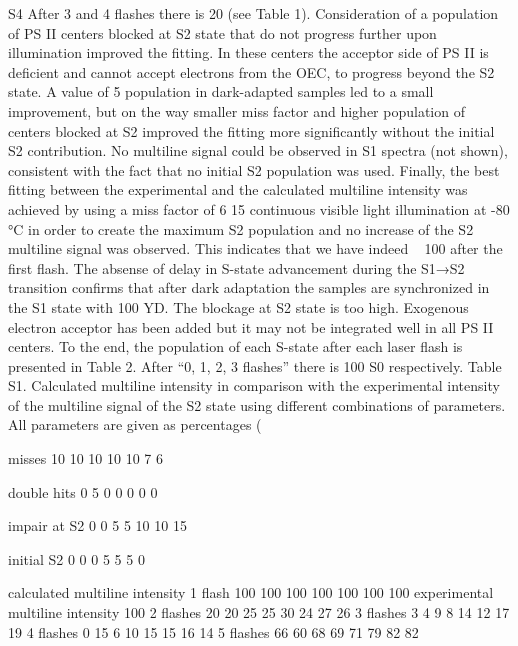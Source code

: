 S4 
After 3 and 4 flashes there is 20%
(see Table 1). Consideration of a population of PS II centers blocked at S2 state that do not progress 
further upon illumination improved the fitting. In these centers the acceptor side of PS II is 
deficient and cannot accept electrons from the OEC, to progress beyond the S2 state. A value of 
5%
population in dark-adapted samples led to a small improvement, but on the way smaller miss factor 
and higher population of centers blocked at S2 improved the fitting more significantly without the 
initial S2 contribution. No multiline signal could be observed in S1 spectra (not shown), consistent 
with the fact that no initial S2 population was used. Finally, the best fitting between the 
experimental and the calculated multiline intensity was achieved by using a miss factor of 6%
15%
continuous visible light illumination at -80 °C in order to create the maximum S2 population and 
no increase of the S2 multiline signal was observed. This indicates that we have indeed ~ 100%
after the first flash. The absense of delay in S-state advancement during the S1→S2 transition 
confirms that after dark adaptation the samples are synchronized in the S1 state with 100%
YD. The blockage at S2 state is too high. Exogenous electron acceptor has been added but it may 
not be integrated well in all PS II centers. To the end, the population of each S-state after each laser 
flash is presented in Table 2. After “0, 1, 2, 3 flashes” there is 100%
S0 respectively.  
Table S1. Calculated multiline intensity in comparison with the experimental intensity of the multiline signal of 
the S2 state using different combinations of parameters. All parameters are given as percentages (%
 
misses 
10 
10 
10 
10 
10 
7 
6 
 
 
 
double hits 
0 
5 
0 
0 
0 
0 
0 
 
 
 
impair at S2 
0 
0 
5 
5 
10 
10 
15 
 
 
 
initial S2 
0 
0 
0 
5 
5 
5 
0 
 
 
calculated multiline 
intensity 
1 flash 
100 
100 
100 
100 
100 
100 
100 
experimental 
multiline intensity 
100 
2 flashes 
20 
20 
25 
25 
30 
24 
27 
26 
3 flashes 
3 
4 
9 
8 
14 
12 
17 
19 
4 flashes 
0 
15 
6 
10 
15 
15 
16 
14 
5 flashes 
66 
60 
68 
69 
71 
79 
82 
82 
 
